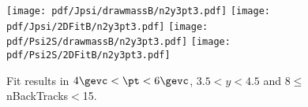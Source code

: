 \begin{figure}[H]
\begin{center}
\texttt{[image: pdf/Jpsi/drawmassB/n2y3pt3.pdf]}
\texttt{[image: pdf/Jpsi/2DFitB/n2y3pt3.pdf]}
\vspace*{-0.5cm}
\texttt{[image: pdf/Psi2S/drawmassB/n2y3pt3.pdf]}
\texttt{[image: pdf/Psi2S/2DFitB/n2y3pt3.pdf]}
\vspace*{-0.5cm}
\end{center}
\caption{Fit results in $4\gevc<\pt<6\gevc$, $3.5<y<4.5$ and 8$\leq$nBackTracks$<$15.}
\label{Fitn2y3pt3}
\end{figure}
